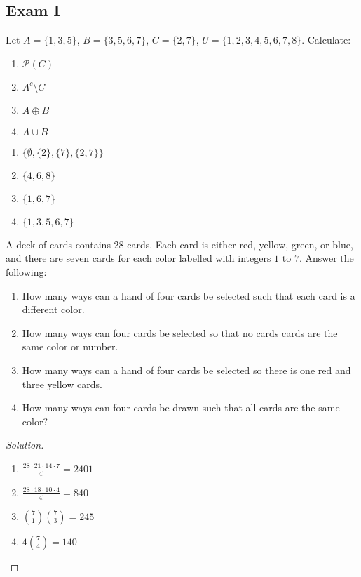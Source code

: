         \subsection{Exam I}
    \begin{problem}
        Let $A = \{1,3,5\}$, $B = \{3,5,6,7\}$, $C = \{2,7\}$,
        $U = \{1,2,3,4,5,6,7,8\}$. Calculate:
        \begin{enumerate}
            \item $\mathcal{P}(C)$
            \item $A^c \setminus C$
            \item $A\oplus B$
            \item $A\cup B$
        \end{enumerate}
    \end{problem}
    \begin{solution}
        \par
        \begin{enumerate}
            \item $\big\{\emptyset, \{2\}, \{7\}, \{2,7\}\big\}$
            \item $\{4,6,8\}$
            \item $\{1,6,7\}$
            \item $\{1,3,5,6,7\}$
        \end{enumerate}
    \end{solution}
    \begin{problem}
        A deck of cards contains 28 cards. Each card is either red, yellow,
        green, or blue, and there are seven cards for each color labelled with
        integers $1$ to $7$. Answer the following:
        \begin{enumerate}
            \item   How many ways can a hand of four cards be selected such that
                    each card is a different color.
            \item   How many ways can four cards be selected so that no cards
                    cards are the same color or number.
            \item   How many ways can a hand of four cards be selected so there
                    is one red and three yellow cards. 
            \item   How many ways can four cards be drawn such that all cards
                    are the same color?
        \end{enumerate}
    \end{problem}
    \begin{proof}[Solution]
        \par
        \begin{enumerate}
            \item $\frac{28 \cdot 21 \cdot 14 \cdot 7}{4!} = 2401$
            \item $\frac{28\cdot 18 \cdot 10 \cdot 4}{4!} = 840$
            \item $\binom{7}{1}\binom{7}{3} = 245$
            \item $4\binom{7}{4} = 140$
        \end{enumerate}
    \end{proof}
